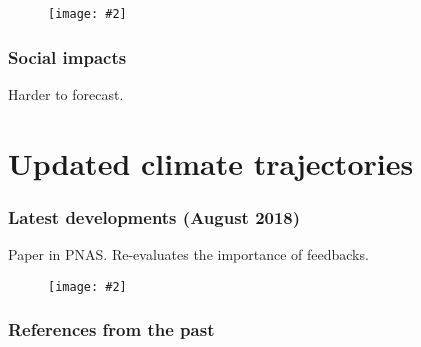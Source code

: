 \documentclass[10pt]{beamer}
\newcommand{\imgtw}[2][1]{%
  \begin{figure}%
    \centering%
    \texttt{[image: \#2]}%
  \end{figure}%
}
\newcommand{\imgth}[2][1]{%
  \begin{figure}%
    \centering%
    \texttt{[image: \#2]}%
  \end{figure}%
}
\begin{document}
\begin{frame}[standout]
  \imgth{ipcc-spm2}
\end{frame}

\begin{frame}
  \frametitle{Social impacts}
  Harder to forecast.
\end{frame}

\section{Updated climate trajectories}
\label{sec:climate-trajectories}

\begin{frame}
  \frametitle{Latest developments (August 2018)}
  Paper in PNAS. Re-evaluates the importance of feedbacks.

\end{frame}

\begin{frame}[standout]
  \imgtw{traj-3}
\end{frame}

\begin{frame}
  \frametitle{References from the past}

\end{frame}
\end{document}
